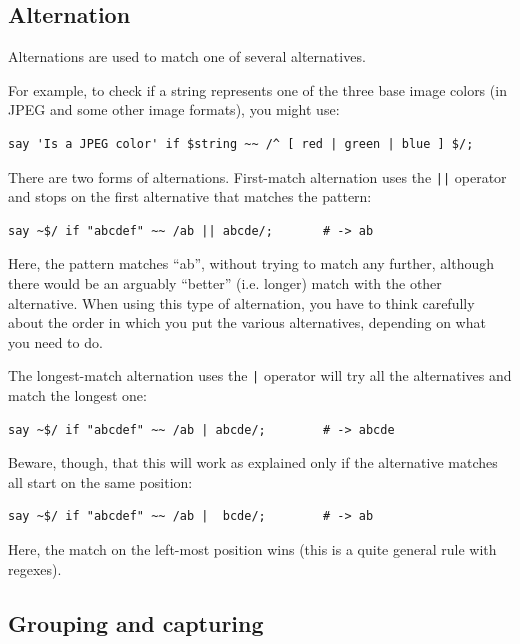 \subsection{Alternation}

Alternations are used to match one of several alternatives.

For example, to check if a string represents one of the 
three base image colors (in JPEG and some other image formats), 
you might use:

\begin{verbatim}
say 'Is a JPEG color' if $string ~~ /^ [ red | green | blue ] $/;
\end{verbatim}
%

There are two forms of alternations. First-match alternation 
uses the \verb'||' operator and stops on the first alternative 
that matches the pattern:

\begin{verbatim}
say ~$/ if "abcdef" ~~ /ab || abcde/;       # -> ab
\end{verbatim}
%

Here, the pattern matches ``ab'', without trying to match 
any further, although there would be an arguably ``better'' 
(i.e. longer) match with the other alternative. When using 
this type of alternation, you have to think carefully about 
the order in which you put the various alternatives, 
depending on what you need to do.

The longest-match alternation uses the \verb'|' operator 
will try all the alternatives and match the longest one:

\begin{verbatim}
say ~$/ if "abcdef" ~~ /ab | abcde/;        # -> abcde
\end{verbatim}
%

Beware, though, that this will work as explained only if 
the alternative matches all start on the same position:

\begin{verbatim}
say ~$/ if "abcdef" ~~ /ab |  bcde/;        # -> ab
\end{verbatim}
%

Here, the match on the left-most position wins (this is 
a quite general rule with regexes).


\subsection{Grouping and capturing}

